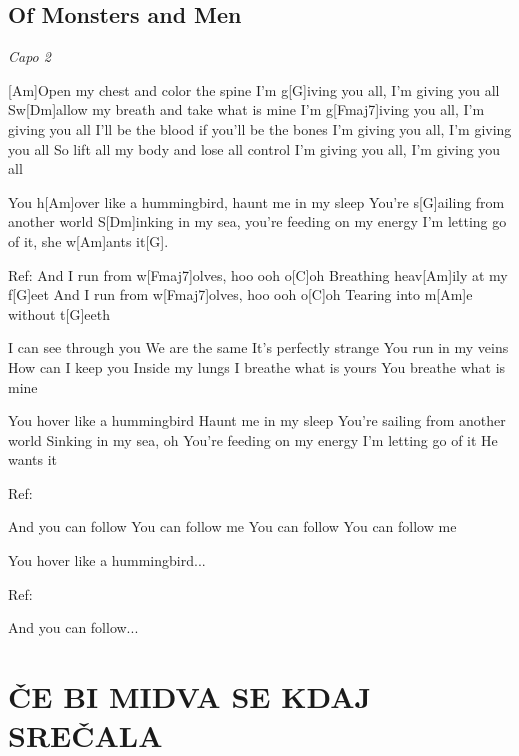 \documentclass{article}
\begin{document}
\subsection*{Of Monsters and Men}
\begin{guitar}
	\textit{Capo 2}
	
	 
	[Am]Open my chest and color the spine
	I'm g[G]iving you all, I'm giving you all
	Sw[Dm]allow my breath and take what is mine
	I'm g[Fmaj7]iving you all, I'm giving you all
	I'll be the blood if you'll be the bones
	I'm giving you all, I'm giving you all
	So lift all my body and lose all control
	I'm giving you all, I'm giving you all
	
    You h[Am]over like a hummingbird, haunt me in my sleep
    You're s[G]ailing from another world
    S[Dm]inking in my sea, you're feeding on my energy
    I'm letting go of it, she w[Am]ants it[G].
    
    
    Ref:
    And I run from w[Fmaj7]olves, hoo ooh o[C]oh
    Breathing heav[Am]ily at my f[G]eet
    And I run from w[Fmaj7]olves, hoo ooh o[C]oh
    Tearing into m[Am]e without t[G]eeth
    
    
    
    I can see through you
    We are the same
    It's perfectly strange
    You run in my veins
    How can I keep you
    Inside my lungs
    I breathe what is yours
    You breathe what is mine
    
    You hover like a hummingbird
    Haunt me in my sleep
    You're sailing from another world
    Sinking in my sea, oh
    You're feeding on my energy
    I'm letting go of it
    He wants it
    
	Ref:
    
    And you can follow
    You can follow me
    You can follow
    You can follow me
    
    You hover like a hummingbird...

    Ref:
    
    And you can follow...

 
	
\end{guitar}

\section*{ČE BI MIDVA SE KDAJ SREČALA}
%
\end{document}
